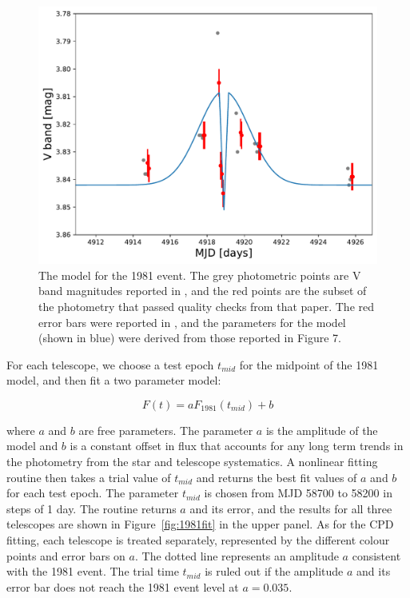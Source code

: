 \documentclass[longauth]{aa} %
\begin{document}
\begin{figure}[htb]
\centering
\includegraphics[width=\columnwidth]{m1981model.pdf}
\caption{The model for the 1981 event. The grey photometric points are V band magnitudes reported in \citet{LecavelierdesEtangs95}, and the red points are the subset of the photometry that passed quality checks from that paper. The red error bars were reported in \citet{Lamers97}, and the parameters for the model (shown in blue) were derived from those reported in \citet{Lamers97} Figure 7.}
\label{fig:1981model}
\end{figure}

For each telescope, we choose a test epoch $t_{mid}$ for the midpoint of the 1981 model, and then fit a two parameter model:

$$F(t) = a F_{1981}(t_{mid}) + b$$

where $a$ and $b$ are free parameters.
%
The parameter $a$ is the amplitude of the model and $b$ is a constant offset in flux that accounts for any long term trends in the photometry from the star and telescope systematics.
%
A nonlinear fitting routine then takes a trial value of $t_{mid}$ and returns the best fit values of $a$ and $b$ for each test epoch.
%
The parameter $t_{mid}$ is chosen from MJD 58700 to 58200 in steps of 1 day.
%
The routine returns $a$ and its error, and the results for all three telescopes are shown in Figure~\ref{fig:1981fit} in the upper panel.
%
As for the CPD fitting, each telescope is treated separately, represented by the different colour points and error bars on $a$.
%
The dotted line represents an amplitude $a$ consistent with the 1981 event.
%
The trial time $t_{mid}$ is ruled out if the amplitude $a$ and its error bar does not reach the 1981 event level at $a=0.035$.
\end{document}

